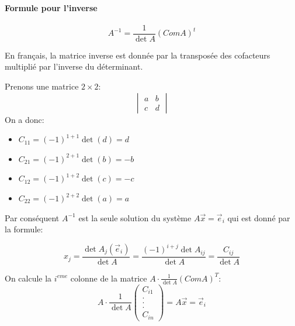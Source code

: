 \paragraph{Formule pour l'inverse}
\begin{definition}
    \begin{equation*}
        A^{-1} = \frac{1}{\det A}(ComA)^t
    \end{equation*}
\end{definition}
En français, la matrice inverse est donnée par la transposée des cofacteurs multiplié par l'inverse du déterminant.

\begin{exemple}
    Prenons une matrice $2 \times 2$:
    \[ \begin{vmatrix}
        a & b \\
        c & d
    \end{vmatrix}
    \]
    On a donc:
    \begin{itemize}
        \item $C_{11} = (-1)^{1+1}\det(d) = d$
        \item $C_{21} = (-1)^{2+1}\det(b) = -b$
        \item $C_{12} = (-1)^{1+2}\det(c) = -c$
        \item $C_{22} = (-1)^{2+2}\det(a) = a$
    \end{itemize}
\end{exemple}
Par conséquent $A^{-1}$ est la seule solution du système $A\vec{x} = \vec{e}_i$ qui est donné par la formule:
\begin{formule}

\[
    x_j = \frac{\det A_j (\vec{e}_i)}{\det A} = \frac{(-1)^{i+j}\det A_{ij}}{\det A} = \frac{C_{ij}}{\det A}
\]
\end{formule}
On calcule la $i^{eme}$ colonne de la matrice $A\cdot\frac{1}{\det A}(ComA)^T$:
\[
A\cdot \frac{1}{\det A}\begin{pmatrix}
    C_{i1}\\
    .\\
    . \\
    . \\
    C_{in}
\end{pmatrix} = A\vec{x} = \vec{e}_i
\]

